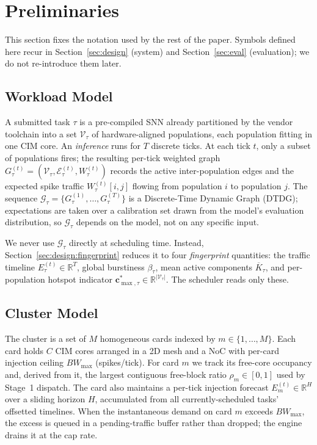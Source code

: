\documentclass[letterpaper,twocolumn,10pt]{article}
\begin{document}
\section{Preliminaries}
\label{sec:prelim}

This section fixes the notation used by the rest of the paper. Symbols defined here recur in Section~\ref{sec:design} (system) and Section~\ref{sec:eval} (evaluation); we do not re-introduce them later.

\subsection{Workload Model}
\label{sec:prelim:workload}

A submitted task $\tau$ is a pre-compiled SNN already partitioned by the vendor toolchain into a set $\mathcal{V}_\tau$ of hardware-aligned populations, each population fitting in one CIM core. An \emph{inference} runs for $T$ discrete ticks. At each tick $t$, only a subset of populations fires; the resulting per-tick weighted graph $G_\tau^{(t)} = (\mathcal{V}_\tau, \mathcal{E}_\tau^{(t)}, W_\tau^{(t)})$ records the active inter-population edges and the expected spike traffic $W_\tau^{(t)}[i,j]$ flowing from population $i$ to population $j$. The sequence $\mathcal{G}_\tau = \{G_\tau^{(1)},\dots,G_\tau^{(T)}\}$ is a Discrete-Time Dynamic Graph (DTDG); expectations are taken over a calibration set drawn from the model's evaluation distribution, so $\mathcal{G}_\tau$ depends on the model, not on any specific input.

We never use $\mathcal{G}_\tau$ directly at scheduling time. Instead, Section~\ref{sec:design:fingerprint} reduces it to four \emph{fingerprint} quantities: the traffic timeline $E_\tau^{(t)}\!\in\!\mathbb{R}^T$, global burstiness $\beta_\tau$, mean active components $\overline{K}_\tau$, and per-population hotspot indicator $\mathbf{c}^{*}_{\max,\tau}\!\in\!\mathbb{R}^{|\mathcal{V}_\tau|}$. The scheduler reads only these.

\subsection{Cluster Model}
\label{sec:prelim:cluster}

The cluster is a set of $M$ homogeneous cards indexed by $m \in \{1,\dots,M\}$. Each card holds $C$ CIM cores arranged in a 2D mesh and a NoC with per-card injection ceiling $BW_{\max}$ (spikes/tick). For card $m$ we track its free-core occupancy and, derived from it, the largest contiguous free-block ratio $\rho_m \in [0,1]$ used by Stage~1 dispatch. The card also maintains a per-tick injection forecast $E_m^{(t)}\!\in\!\mathbb{R}^H$ over a sliding horizon $H$, accumulated from all currently-scheduled tasks' offsetted timelines. When the instantaneous demand on card $m$ exceeds $BW_{\max}$, the excess is queued in a pending-traffic buffer rather than dropped; the engine drains it at the cap rate.
\end{document}
